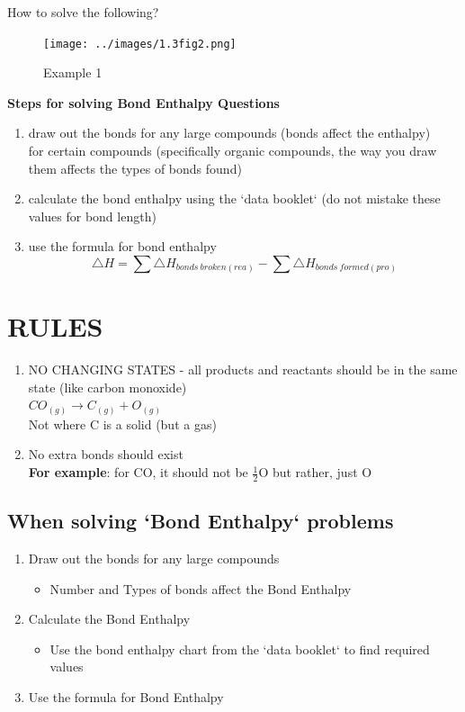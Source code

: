 \documentclass[12pt]{article} %
\begin{document}
How to solve the following?

\begin{figure}[h]
	\centering
	\texttt{[image: ../images/1.3fig2.png]}
	\caption{Example 1}
	\label{fig:image2}
\end{figure}

\textbf{Steps for solving Bond Enthalpy Questions}

\begin{enumerate}
\item draw out the bonds for any large compounds (bonds affect the enthalpy)\\for certain compounds (specifically organic compounds, the way you draw them affects the types of bonds found)
\item calculate the bond enthalpy using the `data booklet` (do not mistake these values for bond length)
\item use the formula for bond enthalpy\\$$\triangle{H} = \sum{\triangle{H}_{bonds\ broken(rea)}} - \sum{\triangle{H}_{bonds\ formed(pro)}}$$
\end{enumerate}

\pagebreak

\section{\textbf{RULES}}

\begin{enumerate}
\item NO CHANGING STATES - all products and reactants should be in the same state (like carbon monoxide)\\ $CO_{(g)} \rightarrow C_{(g)} + O_{(g)}$\\Not where C is a solid (but a gas)
\item No extra bonds should exist\\\textbf{For example}: for CO, it should not be $\frac{1}{2}$O but rather, just O
\end{enumerate}

\subsection{When solving `Bond Enthalpy` problems}

\begin{enumerate}
\item Draw out the bonds for any large compounds
	\begin{itemize}
	\item Number and Types of bonds affect the Bond Enthalpy
	\end{itemize}
\item Calculate the Bond Enthalpy
	\begin{itemize}
	\item Use the bond enthalpy chart from the `data booklet` to find required values
	\end{itemize}
\item Use the formula for Bond Enthalpy
\end{enumerate}
\end{document}
